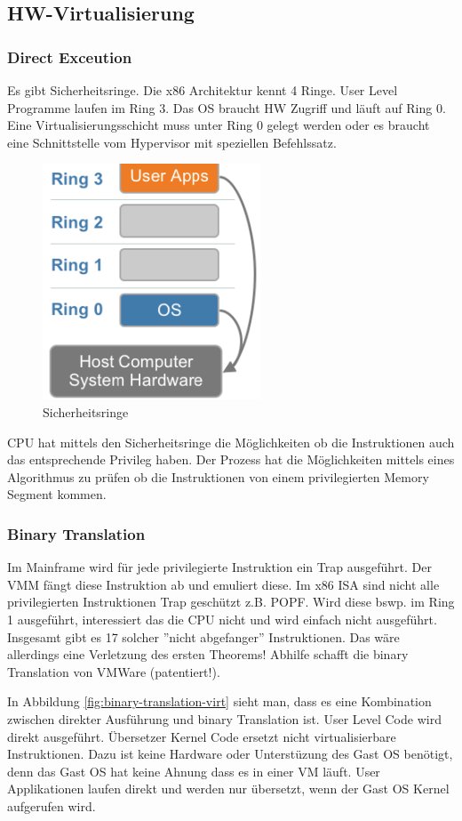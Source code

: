\newpage

\subsection{HW-Virtualisierung}

\subsubsection{Direct Exceution}
Es gibt Sicherheitsringe. Die x86 Architektur kennt 4 Ringe. User Level Programme laufen im Ring 3. Das OS braucht HW Zugriff und läuft auf Ring 0. Eine Virtualisierungsschicht muss unter Ring 0 gelegt werden oder es braucht eine Schnittstelle vom Hypervisor mit speziellen Befehlssatz. 
\begin{figure}[h!]
\centering
\includegraphics[width=0.3\linewidth]{fig/sicherheitsringe}
\caption{Sicherheitsringe}
\label{fig:sicherheitsringe}
\end{figure}
CPU hat mittels den Sicherheitsringe die Möglichkeiten ob die Instruktionen auch das entsprechende Privileg haben. Der Prozess hat die Möglichkeiten mittels eines Algorithmus zu prüfen ob die Instruktionen von einem privilegierten Memory Segment kommen.

\subsubsection{Binary Translation}
Im Mainframe wird für jede privilegierte Instruktion ein Trap ausgeführt. Der VMM fängt diese Instruktion ab und emuliert diese. Im x86 ISA sind nicht alle privilegierten Instruktionen Trap geschützt z.B. POPF. Wird diese bswp. im Ring 1 ausgeführt, interessiert das die CPU nicht und wird einfach nicht ausgeführt. Insgesamt gibt es 17 solcher ''nicht abgefanger'' Instruktionen. Das wäre allerdings eine Verletzung des ersten Theorems! Abhilfe schafft die binary Translation von VMWare (patentiert!).

In Abbildung \ref{fig:binary-translation-virt} sieht man, dass es eine Kombination zwischen direkter Ausführung und binary Translation ist. User Level Code wird direkt ausgeführt. Übersetzer Kernel Code ersetzt nicht virtualisierbare Instruktionen. Dazu ist keine Hardware oder Unterstüzung des Gast OS benötigt, denn das Gast OS hat keine Ahnung dass es in einer VM läuft. User Applikationen laufen direkt und werden nur übersetzt, wenn der Gast OS Kernel aufgerufen wird.

